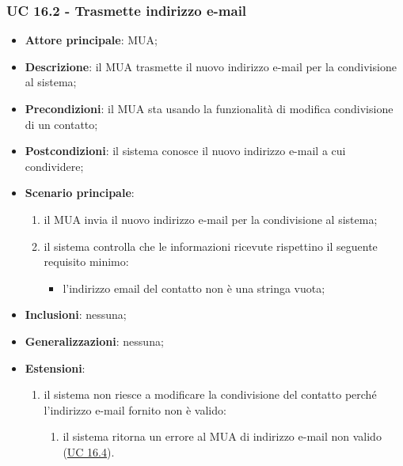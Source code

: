     \subsubsection{UC 16.2 - Trasmette indirizzo e-mail} \label{sec:UC16.2}
    \begin{itemize}
        \item \textbf{Attore principale}: MUA;
        \item \textbf{Descrizione}: il MUA trasmette il nuovo indirizzo e-mail per la condivisione al sistema;
        \item \textbf{Precondizioni}: il MUA sta usando la funzionalità di modifica condivisione di un contatto;
        \item \textbf{Postcondizioni}: il sistema conosce il nuovo indirizzo e-mail a cui condividere;
        \item \textbf{Scenario principale}:
            \begin{enumerate}
                \item il MUA invia il nuovo indirizzo e-mail per la condivisione al sistema;
                \item il sistema controlla che le informazioni ricevute rispettino il seguente requisito minimo:
                    \begin{itemize}
                        \item l'indirizzo email del contatto non è una stringa vuota;
                    \end{itemize}
            \end{enumerate}
        \item \textbf{Inclusioni}: nessuna;
        \item \textbf{Generalizzazioni}: nessuna;
        \item \textbf{Estensioni}:
            \begin{enumerate}[label=\alph*.]
                \item il sistema non riesce a modificare la condivisione del contatto perché l'indirizzo e-mail fornito non è valido:
                \begin{enumerate}[label=\arabic*.]
                    \item il sistema ritorna un errore al MUA di indirizzo e-mail non valido (\hyperref[sec:UC16.4]{UC 16.4}).
                \end{enumerate}
            \end{enumerate}
    \end{itemize}



